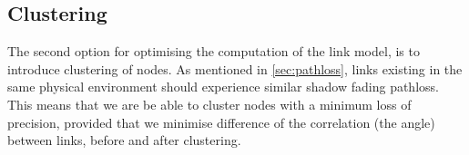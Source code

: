 \subsection{Clustering}\label{sec:clustering}
The second option for optimising the computation of the link model, is to introduce clustering of nodes. As mentioned in \autoref{sec:pathloss}, links existing in the same physical environment should experience similar shadow fading \gls{pathloss}. This means that we are be able to cluster nodes with a minimum loss of precision, provided that we minimise difference of the correlation (the angle) between links, before and after clustering.





